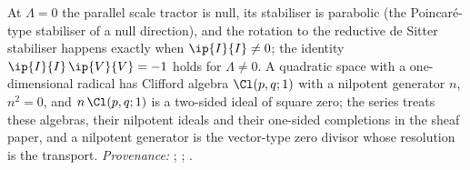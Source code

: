 At $\Lambda = 0$ the parallel scale tractor is null, its stabiliser is parabolic (the Poincar\'e-type stabiliser of a null direction), and the rotation to the reductive de Sitter stabiliser happens exactly when $\ip{I}{I} \neq 0$; the identity $\ip{I}{I}\,\ip{V}{V} = -1$ holds for $\Lambda \neq 0$. A quadratic space with a one-dimensional radical has Clifford algebra $\Cl(p,q;1)$ with a nilpotent generator $n$, $n^{2} = 0$, and $n\,\Cl(p,q;1)$ is a two-sided ideal of square zero; the series treats these algebras, their nilpotent ideals and their one-sided completions in the sheaf paper, and a nilpotent generator is the vector-type zero divisor whose resolution is the transport. \emph{Provenance:} \cite[Fact~2.1, Thm.~3.1]{ButlerT10}; \cite[Thm.~3.1, Prop.~3.4, Thm.~4.4]{ButlerT4}; \cite[\S 4]{ButlerT1}.
